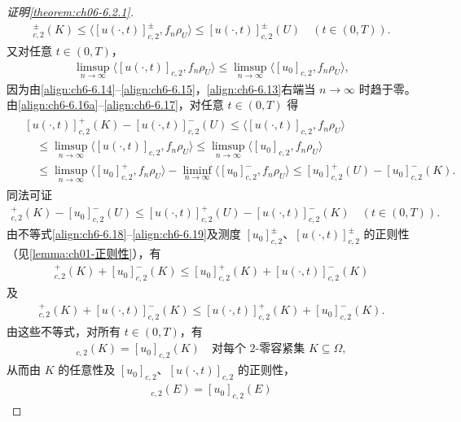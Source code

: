 \documentclass[../../main.tex]{subfiles}%
\begin{document}
\begin{proof}[证明\cref{theorem:ch06-6.2.1}]
\begin{align}
[u(\cdot,t)]^\pm_{c,2}(K)\leqslant\langle[u(\cdot,t)]^\pm_{c,2},f_n\rho_U\rangle\leqslant[u(\cdot,t)]^\pm_{c,2}(U)
\quad(t\in(0,T)). \label{align:ch6-6.16b}
\end{align}
又对任意 $t\in(0,T)$，
\begin{align}
\limsup_{n\to\infty}\langle[u(\cdot,t)]_{c,2},f_n\rho_U\rangle
\leqslant\limsup_{n\to\infty}\langle[u_0]_{c,2},f_n\rho_U\rangle, \label{align:ch6-6.17}
\end{align}
因为由\eqref{align:ch6-6.14}--\eqref{align:ch6-6.15}，\eqref{align:ch6-6.13}右端当 $n\to\infty$ 时趋于零。由\eqref{align:ch6-6.16a}--\eqref{align:ch6-6.17}，对任意 $t\in(0,T)$ 得
\begin{align}
\begin{aligned}
&[u(\cdot,t)]^+_{c,2}(K)-[u(\cdot,t)]^-_{c,2}(U)
\leqslant\langle[u(\cdot,t)]_{c,2},f_n\rho_U\rangle\\
&\quad\leqslant\limsup_{n\to\infty}\langle[u(\cdot,t)]_{c,2},f_n\rho_U\rangle
\leqslant\limsup_{n\to\infty}\langle[u_0]_{c,2},f_n\rho_U\rangle\\
&\quad\leqslant\limsup_{n\to\infty}\langle[u_0]^+_{c,2},f_n\rho_U\rangle
-\liminf_{n\to\infty}\langle[u_0]^-_{c,2},f_n\rho_U\rangle
\leqslant[u_0]^+_{c,2}(U)-[u_0]^-_{c,2}(K).
\end{aligned}
\label{align:ch6-6.18}
\end{align}
同法可证
\begin{align}
[u_0]^+_{c,2}(K)-[u_0]^-_{c,2}(U)
\leqslant[u(\cdot,t)]^+_{c,2}(U)-[u(\cdot,t)]^-_{c,2}(K)
\quad(t\in(0,T)). \label{align:ch6-6.19}
\end{align}
由不等式\eqref{align:ch6-6.18}--\eqref{align:ch6-6.19}及测度 $[u_0]^\pm_{c,2}$、$[u(\cdot,t)]^\pm_{c,2}$ 的正则性（见\cref{lemma:ch01-正则性}），有
\begin{align*}
[u(\cdot,t)]^+_{c,2}(K)+[u_0]^-_{c,2}(K)
\leqslant[u_0]^+_{c,2}(K)+[u(\cdot,t)]^-_{c,2}(K)
\end{align*}
及
\begin{align*}
[u_0]^+_{c,2}(K)+[u(\cdot,t)]^-_{c,2}(K)
\leqslant[u(\cdot,t)]^+_{c,2}(K)+[u_0]^-_{c,2}(K).
\end{align*}
由这些不等式，对所有 $t\in(0,T)$，有
\begin{align*}
[u(\cdot,t)]_{c,2}(K)=[u_0]_{c,2}(K)
\quad\text{对每个 }2\text{-零容紧集 }K\subseteq\Omega,
\end{align*}
从而由 $K$ 的任意性及 $[u_0]_{c,2}$、$[u(\cdot,t)]_{c,2}$ 的正则性，
\begin{align}
[u(\cdot,t)]_{c,2}(E)=[u_0]_{c,2}(E)

\end{align}
\end{proof}
\end{document}
